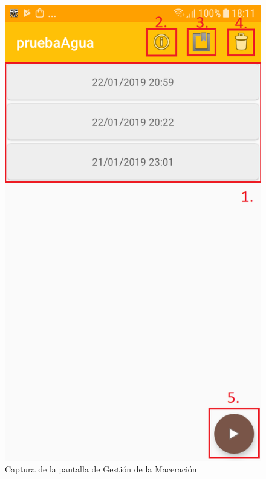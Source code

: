                 \begin{figure}[h]
                    \centering
                    \includegraphics[scale=0.2]{software/ScreenCapture/ExperimentActivity.jpg}
                    \caption{Captura de la pantalla de Gestión de la Maceración}
                    \label{fig:CapturaExperimentAct}
                \end{figure}
                
